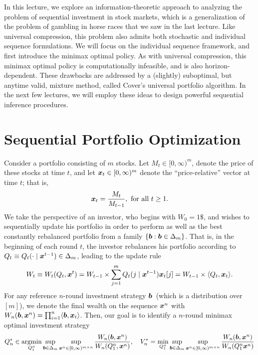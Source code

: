 \documentclass[12pt]{article}
\begin{document}
	\MakeScribeTop

In this lecture, we explore an information-theoretic approach to analyzing the problem of sequential investment in stock markets, which is a generalization of the problem of gambling in horse races that we saw in the last lecture. Like universal compression, this problem also admits both stochastic and individual sequence formulations. We will focus on the individual sequence framework, and first introduce the minimax optimal policy. As with universal compression, this minimax optimal policy is computationally infeasible, and is also horizon-dependent. These drawbacks are addressed by a (slightly) suboptimal, but anytime valid, mixture method, called Cover's universal portfolio algorithm. 
In the next few lectures, we will employ these ideas to design powerful sequential inference procedures. 

\section{Sequential Portfolio Optimization}

Consider a portfolio consisting of $m$ stocks. Let $M_t \in [0, \infty)^m$, denote the price of these stocks at time $t$, and let ${\boldsymbol x}_t \in [0, \infty)^m$ denote the ``price-relative'' vector at time $t$; that is, 
\begin{align}
    {\boldsymbol x}_t = \frac{M_t}{M_{t-1}}, \text{ for all } t \geq 1. 
\end{align}
We take the perspective of an investor, who begins with $W_0 = 1\$$, and wishes to sequentially update his portfolio in order to perform as well as the best constantly rebalanced portfolio from a family $\{\boldsymbol{b}: \boldsymbol{b} \in \Delta_m\}$. That is, in the beginning of each round $t$, the investor rebalances his portfolio according to $Q_t \equiv Q_t(\cdot \mid {\boldsymbol x}^{t-1}) \in \Delta_m$, leading to the update rule 
\begin{align}
    W_t \equiv W_t(Q_t, {\boldsymbol x}^t) = W_{t-1} \times \sum_{j=1}^m Q_t(j\mid {\boldsymbol x}^{t-1}) {\boldsymbol x}_t[j] = W_{t-1} \times \langle Q_t, {\boldsymbol x}_t \rangle. 
\end{align}
For any reference $n$-round investment strategy $\boldsymbol{b}$~(which is  a distribution over $[m]$), we denote the final wealth on the sequence ${\boldsymbol x}^n$ with $W_n(\boldsymbol{b}, {\boldsymbol x}^n) = \prod_{i=1}^n \langle \boldsymbol{b}, {\boldsymbol x}_t \rangle$. Then, our goal is to identify a $n$-round minimax optimal investment strategy 
\begin{align}
    Q_n^* \in \operatorname*{argmin}_{Q_1^n} \sup_{\boldsymbol{b} \in \Delta_m} \sup_{{\boldsymbol x}^n \in [0,\infty)^{m \times n}}    \frac{W_n(\boldsymbol{b}, {\boldsymbol x}^n)}{W_n(Q_1^n, {\boldsymbol x}^n)}, \quad V^*_n =\min_{Q_1^n} \sup_{\boldsymbol{b} \in \Delta_m} \sup_{{\boldsymbol x}^n \in [0,\infty)^{m \times n}}    \frac{W_n(\boldsymbol{b}, {\boldsymbol x}^n)}{W_n(Q_1^n {\boldsymbol x}^n)} 
\end{align}
\end{document}
